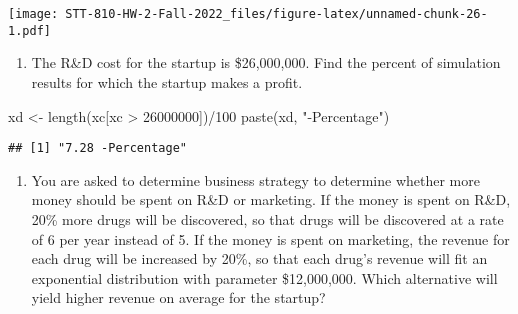 \documentclass[
]{article}
\newenvironment{Shaded}{\begin{snugshade}}{\end{snugshade}}
\newcommand{\DecValTok}[1]{\textcolor[rgb]{0.00,0.00,0.81}{#1}}
\newcommand{\FunctionTok}[1]{\textcolor[rgb]{0.00,0.00,0.00}{#1}}
\newcommand{\NormalTok}[1]{#1}
\newcommand{\OtherTok}[1]{\textcolor[rgb]{0.56,0.35,0.01}{#1}}
\newcommand{\SpecialCharTok}[1]{\textcolor[rgb]{0.00,0.00,0.00}{#1}}
\newcommand{\StringTok}[1]{\textcolor[rgb]{0.31,0.60,0.02}{#1}}
\providecommand{\tightlist}{%
  \setlength{\itemsep}{0pt}\setlength{\parskip}{0pt}}
\begin{document}
\texttt{[image: STT-810-HW-2-Fall-2022\_files/figure-latex/unnamed-chunk-26-1.pdf]}

\begin{enumerate}
\def\labelenumi{\alph{enumi}.}
\setcounter{enumi}{3}
\tightlist
\item
  The R\&D cost for the startup is \$26,000,000. Find the percent of
  simulation results for which the startup makes a profit.
\end{enumerate}

\begin{Shaded}
\begin{Highlighting}[]
\NormalTok{xd }\OtherTok{\textless{}{-}} \FunctionTok{length}\NormalTok{(xc[xc }\SpecialCharTok{\textgreater{}} \DecValTok{26000000}\NormalTok{])}\SpecialCharTok{/}\DecValTok{100}
\FunctionTok{paste}\NormalTok{(xd, }\StringTok{"{-}Percentage"}\NormalTok{)}
\end{Highlighting}
\end{Shaded}

\begin{verbatim}
## [1] "7.28 -Percentage"
\end{verbatim}

\begin{enumerate}
\def\labelenumi{\alph{enumi}.}
\setcounter{enumi}{4}
\tightlist
\item
  You are asked to determine business strategy to determine whether more
  money should be spent on R\&D or marketing. If the money is spent on
  R\&D, 20\% more drugs will be discovered, so that drugs will be
  discovered at a rate of 6 per year instead of 5. If the money is spent
  on marketing, the revenue for each drug will be increased by 20\%, so
  that each drug's revenue will fit an exponential distribution with
  parameter \$12,000,000. Which alternative will yield higher revenue on
  average for the startup?
\end{enumerate}
\end{document}
